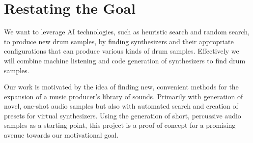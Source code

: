 \documentclass[\main/thesis.tex]{subfiles}
\begin{document}
\section{Restating the Goal}
We want to leverage AI technologies, such as heuristic search and random search, to produce new drum samples, by finding synthesizers and their appropriate configurations that can produce various kinds of drum samples. Effectively we will combine machine listening and code generation of synthesizers to find drum samples.

Our work is motivated by the idea of finding new, convenient methods for the expansion of a music producer's library of sounds. Primarily with generation of novel, one-shot audio samples but also with automated search and creation of presets for virtual synthesizers. Using the generation of short, percussive audio samples as a starting point, this project is a proof of concept for a promising avenue towards our motivational goal.
\end{document}
